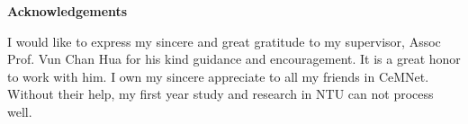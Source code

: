 \documentclass[12pt,a4paper]{report}
\begin{document}
\begin{abstract}

\end{abstract}

\newpage
\begin{center}
\Large
\vspace{3cm} \textbf{Acknowledgements}
\end{center}
\normalsize
\indent \indent I would like to express my sincere and great gratitude to my supervisor, Assoc Prof. Vun Chan Hua for his kind guidance and encouragement. It is a great honor to work with him. I own my sincere appreciate to all my friends in CeMNet. Without their help, my first year study and research in NTU can not process well.


\newpage
\makeatletter
\let \asas \ps@plain
\let \ps@plain \ps@empty
\makeatother \large
\tableofcontents
\listoffigures
\listoftables
\end{document}

